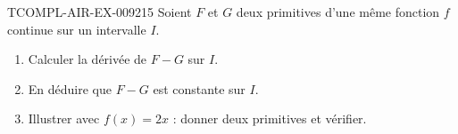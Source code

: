 \begin{exercice}{TCOMPL-AIR-EX-009}{2}{15}
Soient $F$ et $G$ deux primitives d'une même fonction $f$ continue sur un
intervalle $I$.
\begin{enumerate}
  \item Calculer la dérivée de $F-G$ sur $I$.
  \item En déduire que $F-G$ est constante sur $I$.
  \item Illustrer avec $f(x)=2x$ : donner deux primitives et vérifier.
\end{enumerate}
\end{exercice}
